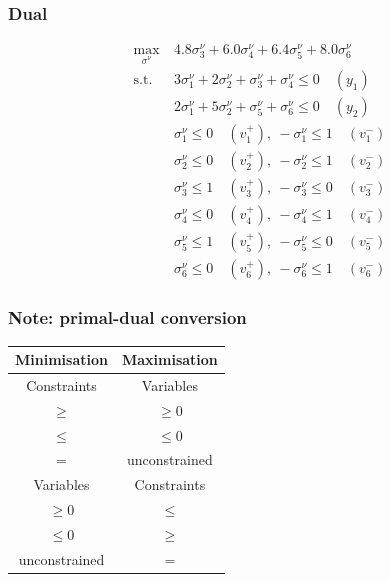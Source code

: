 \documentclass{beamer}
\begin{document}
\begin{frame}
\frametitle{Dual}	

\begin{align*}
\max_{\sigma^{\nu}}\ & 4.8\sigma_3^{\nu} + 6.0\sigma_4^{\nu} + 6.4\sigma_5^{\nu} + 8.0\sigma_6^{\nu} \\
\mbox{s.t. } & 3\sigma_1^{\nu} + 2 \sigma_2^{\nu} + \sigma_3^{\nu} + \sigma_4^{\nu} \leq 0  \quad (y_1)\\
& 2\sigma_1^{\nu} + 5 \sigma_2^{\nu} + \sigma_5^{\nu} + \sigma_6^{\nu} \leq 0 \quad (y_2)\\
& \sigma_1^{\nu} \leq 0 \quad (v_1^+),\ -\sigma_1^{\nu} \leq 1 \quad (v_1^-) \\
& \sigma_2^{\nu} \leq 0 \quad (v_2^+),\ -\sigma_2^{\nu} \leq 1 \quad (v_2^-) \\
& \sigma_3^{\nu} \leq 1 \quad (v_3^+),\ -\sigma_3^{\nu} \leq 0 \quad (v_3^-) \\ 
& \sigma_4^{\nu} \leq 0 \quad (v_4^+),\ -\sigma_4^{\nu} \leq 1 \quad (v_4^-) \\
& \sigma_5^{\nu} \leq 1 \quad (v_5^+),\ -\sigma_5^{\nu} \leq 0 \quad  (v_5^-) \\
& \sigma_6^{\nu} \leq 0 \quad (v_6^+),\ -\sigma_6^{\nu} \leq 1 \quad  (v_6^-) %
\end{align*}
	
\end{frame}


\begin{frame}
\frametitle{Note: primal-dual conversion}

\begin{center}
	\begin{tabular}{|c|c|}
		\hline
		\hline
		{\bf Minimisation} & {\bf Maximisation} \\
		\hline
		\hline
		Constraints & Variables \\
		$\geq$ & $\geq 0$ \\
		$\leq$ & $\leq 0$ \\
		$=$ & unconstrained \\
		\hline
		Variables & Constraints \\
		\hline
		$\geq 0$ & $\leq$ \\
		$\leq 0$ & $\geq$ \\
		unconstrained & $=$ \\
		\hline
	\end{tabular}
\end{center}

\end{frame}
\end{document}
